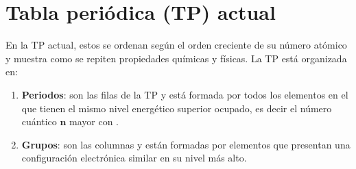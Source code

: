 \renewcommand{\tablename}{Tabla}


%
%
%

\section{Tabla periódica (TP) actual}\label{subsec:tabla-periodica-(tp)-actual}

En la TP actual, estos se ordenan según el orden creciente de su número atómico y muestra como se repiten propiedades químicas y físicas.
La TP está organizada en:
\begin{enumerate}[label=\numberballmDarkTeal]
        \item \textbf{Periodos}: son las filas de la TP y está formada por todos los elementos en el que tienen el mismo nivel energético superior ocupado, es decir el número cuántico $\bm{n}$ mayor con \el{}.
        \item \textbf{Grupos}: son las columnas y están formadas por elementos que presentan una configuración electrónica similar en su nivel más alto.
\end{enumerate}


